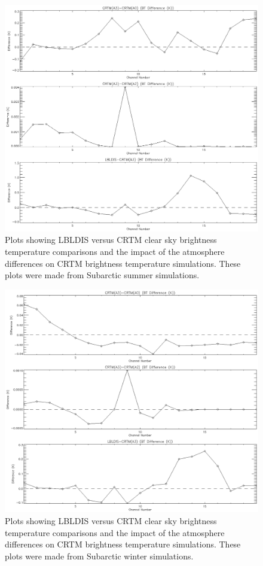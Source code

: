 \begin{figure}[htp]
  \centering{}
  \includegraphics[scale=0.8]{./graphics/BT_Differences_14.eps}
  \caption{Plots showing LBLDIS versus CRTM clear sky brightness temperature comparisons and the
  impact of the atmosphere differences on CRTM brightness temperature simulations. These plots were 
  made from Subarctic summer simulations.}
  \label{fig:BT_Differences_Subarctic_summer}
\end{figure}

\begin{figure}[htp]
  \centering{}
  \includegraphics[scale=0.8]{./graphics/BT_Differences_15.eps}
  \caption{Plots showing LBLDIS versus CRTM clear sky brightness temperature comparisons and the
  impact of the atmosphere differences on CRTM brightness temperature simulations. These plots were 
  made from Subarctic winter simulations.}
  \label{fig:BT_Differences_Subarctic_winter}
\end{figure}

